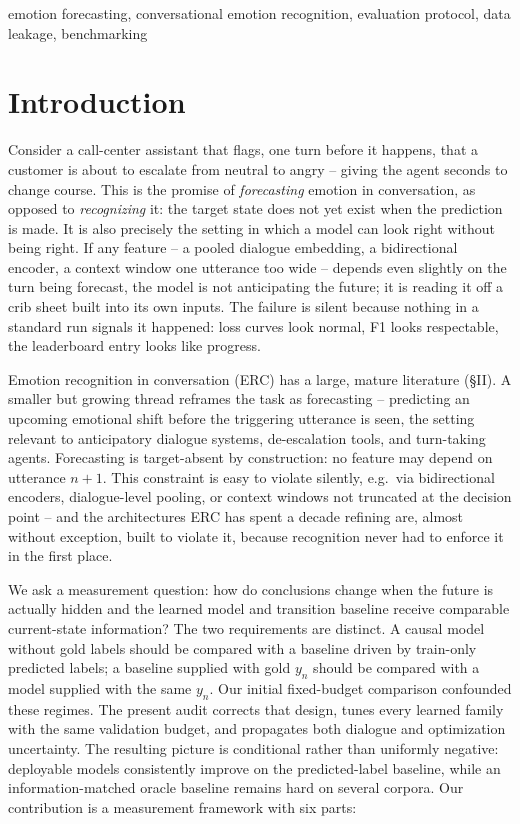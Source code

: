 \documentclass{ieeeaccess}
\begin{document}
\begin{keywords}
emotion forecasting, conversational emotion recognition, evaluation protocol, data leakage, benchmarking
\end{keywords}

\titlepgskip=-21pt
\maketitle

\section{Introduction}

Consider a call-center assistant that flags, one turn before it happens, that a customer is about
to escalate from neutral to angry -- giving the agent seconds to change course. This is the promise
of \emph{forecasting} emotion in conversation, as opposed to \emph{recognizing} it: the target
state does not yet exist when the prediction is made. It is also precisely the setting in which a
model can look right without being right. If any feature -- a pooled dialogue embedding, a
bidirectional encoder, a context window one utterance too wide -- depends even slightly on the turn
being forecast, the model is not anticipating the future; it is reading it off a crib sheet built
into its own inputs. The failure is silent because nothing in a standard run signals it happened:
loss curves look normal, F1 looks respectable, the leaderboard entry looks like progress.

Emotion recognition in conversation (ERC) has a large, mature literature (\S II). A smaller but
growing thread reframes the task as forecasting -- predicting an upcoming emotional shift before
the triggering utterance is seen, the setting relevant to anticipatory dialogue systems,
de-escalation tools, and turn-taking agents. Forecasting is target-absent by construction: no
feature may depend on utterance $n{+}1$. This constraint is easy to violate silently, e.g.\ via
bidirectional encoders, dialogue-level pooling, or context windows not truncated at the decision
point -- and the architectures ERC has spent a decade refining are, almost without exception, built
to violate it, because recognition never had to enforce it in the first place.

We ask a measurement question: how do conclusions change when the future is actually hidden and
the learned model and transition baseline receive comparable current-state information? The two
requirements are distinct. A causal model without gold labels should be compared with a baseline
driven by train-only predicted labels; a baseline supplied with gold $y_n$ should be compared with
a model supplied with the same $y_n$. Our initial fixed-budget comparison confounded these regimes.
The present audit corrects that design, tunes every learned family with the same validation budget,
and propagates both dialogue and optimization uncertainty. The resulting picture is conditional
rather than uniformly negative: deployable models consistently improve on the predicted-label
baseline, while an information-matched oracle baseline remains hard on several corpora. Our
contribution is a measurement framework with six parts:
\end{document}
